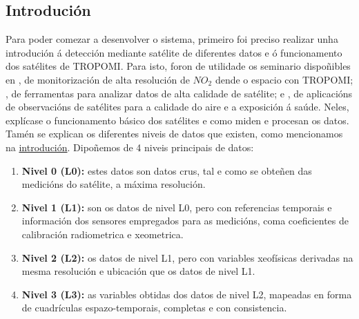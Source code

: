 \subsection{Introdución}
Para poder comezar a desenvolver o sistema, primeiro foi preciso realizar unha introdución á detección mediante satélite de diferentes datos e ó funcionamento dos satélites de TROPOMI. Para isto,
foron de utilidade os seminario dispoñibles en \cite{ARSETformation}, de monitorización de alta resolución de $NO_2$ dende o espacio con TROPOMI; \cite{ARSETtools}, de ferramentas para analizar
datos de alta calidade de satélite; e \cite{ARSETaplications}, de aplicacións de observacións de satélites para a calidade do aire e a exposición á saúde. Neles, explícase o funcionamento básico dos
satélites e como miden e procesan os datos. Tamén se explican os diferentes niveis de datos que existen, como mencionamos na \hyperref[introducion]{introdución}. Dipoñemos de 4 niveis principais de
datos:
\begin{enumerate}
    \item \textbf{Nivel 0 (L0):} estes datos son datos crus, tal e como se obteñen das medicións do satélite, a máxima resolución.
    \item \textbf{Nivel 1 (L1):} son os datos de nivel L0, pero con referencias temporais e información dos sensores empregados para as medicións, coma coeficientes de calibración radiometrica e
    xeometrica.
    \item \textbf{Nivel 2 (L2):} os datos de nivel L1, pero con variables xeofísicas derivadas na mesma resolución e ubicación que os datos de nivel L1.
    \item \textbf{Nivel 3 (L3):} as variables obtidas dos datos de nivel L2, mapeadas en forma de cuadrículas espazo-temporais, completas e con consistencia.
\end{enumerate}


